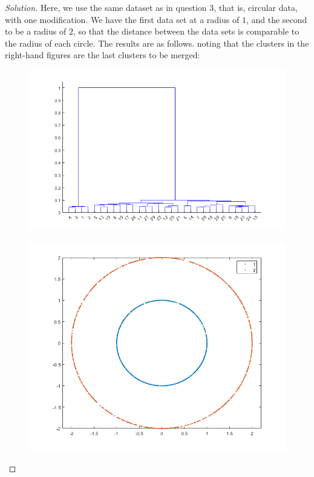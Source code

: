 \documentclass[10pt]{article}
\begin{document}
\begin{proof}[Solution]

Here, we use the same dataset as in question 3, that is, circular data, with one modification. We have the first data set at a radius of $1$, and the second to be a radius of $2$, so that the distance between the data sets is comparable to the radius of each circle. The results are as follows. noting that the clusters in the right-hand figures are the last clusters to be merged:

\begin{figure}[H]
\centering
\begin{minipage}{.5\textwidth}
  \centering
  \includegraphics[width=\linewidth]{single_linkage_dendro}
  \label{fig:test1}
\end{minipage}%
\begin{minipage}{.5\textwidth}
  \centering
  \includegraphics[width=\linewidth]{single_linkage_clusters}
  \label{fig:test2}
\end{minipage}
\end{figure}


\end{proof}
\end{document}
